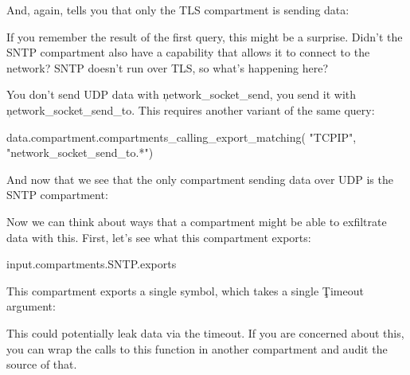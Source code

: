 
And, again, tells you that only the TLS compartment is sending data:

\begin{jsonsnippet}
[
  "TLS"
]
\end{jsonsnippet}

If you remember the result of the first query, this might be a surprise.
Didn't the SNTP compartment also have a capability that allows it to connect to the network?
SNTP doesn't run over TLS, so what's happening here?

You don't send UDP data with \c{network_socket_send}, you send it with \c{network_socket_send_to}.
This requires another variant of the same query:

\begin{regosnippet}
data.compartment.compartments_calling_export_matching(
	"TCPIP",
	"network_socket_send_to.*") 
\end{regosnippet}

And now that we see that the only compartment sending data over UDP is the SNTP compartment:

\begin{jsonsnippet}
[
  "SNTP"
]
\end{jsonsnippet}

Now we can think about ways that a compartment might be able to exfiltrate data with this.
First, let's see what this compartment exports:

\begin{regosnippet}
input.compartments.SNTP.exports
\end{regosnippet}

This compartment exports a single symbol, which takes a single \c{Timeout} argument:

\begin{jsonsnippet}
[
  {
    "export_symbol": "__export_SNTP__Z11sntp_updateP7Timeout",
    "exported": false,
    "interrupt_status": "enabled",
    "kind": "Function",
    "register_arguments": 1,
    "start_offset": 208
  \}
]
\end{jsonsnippet}

This could potentially leak data via the timeout.
If you are concerned about this, you can wrap the calls to this function in another compartment and audit the source of that.

